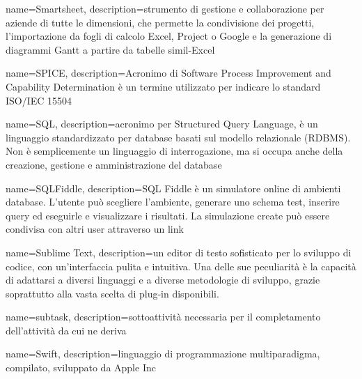 {
	name=Smartsheet,
	description={strumento di gestione e collaborazione per aziende di tutte le dimensioni, che permette la condivisione dei progetti, l'importazione da fogli di calcolo Excel, Project o Google e la generazione di diagrammi Gantt a partire da tabelle simil-Excel}
}

{
	name=SPICE,
	description={Acronimo di Software Process Improvement and Capability Determination è un termine utilizzato per indicare lo standard ISO/IEC 15504}
}

{
	name=SQL,
	description={acronimo per Structured Query Language, è un linguaggio standardizzato per database basati sul modello relazionale (RDBMS). Non è semplicemente un linguaggio di interrogazione, ma si occupa anche della creazione, gestione e amministrazione del database}
}

{
	name=SQLFiddle,
	description={SQL Fiddle è un simulatore online di ambienti database. L'utente può scegliere l'ambiente, generare uno schema test, inserire query ed eseguirle e visualizzare i risultati. La simulazione create può essere condivisa con altri user attraverso un link}
}

{
	name=Sublime Text,
	description={un editor di testo sofisticato per lo sviluppo di codice, con un'interfaccia pulita e intuitiva. Una delle sue peculiarit\`{a} \`{e} la capacità di adattarsi a diversi linguaggi e a diverse metodologie di sviluppo, grazie soprattutto alla vasta scelta di plug-in disponibili.}
}

{
	name=subtask,
	description={sottoattività necessaria per il completamento dell'attività da cui ne deriva}
}

{
	name=Swift,
	description={linguaggio di programmazione multiparadigma, compilato, sviluppato da Apple Inc}
}
